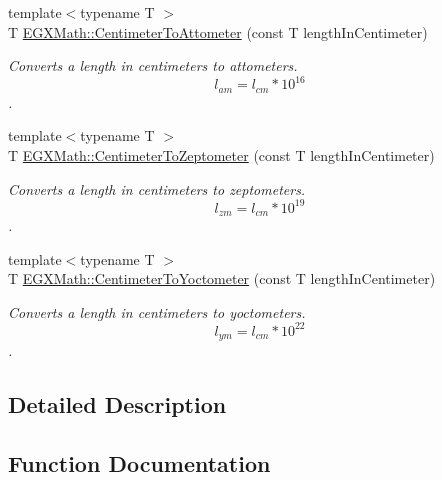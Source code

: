 \begin{DoxyCompactItemize}
{\footnotesize template$<$typename T $>$ }\\T \mbox{\hyperlink{group___e_g_x_math-_conversions-_length_conversions-_s_i-_centimeter-_s_i_ga72eb99d67c7923a3b17886b47a0fa14d}{E\+G\+X\+Math\+::\+Centimeter\+To\+Attometer}} (const T length\+In\+Centimeter)
\begin{DoxyCompactList}\small\item\em Converts a length in centimeters to attometers. \[ l_{am}=l_{cm} * 10^{16} \]. \end{DoxyCompactList}\item 
{\footnotesize template$<$typename T $>$ }\\T \mbox{\hyperlink{group___e_g_x_math-_conversions-_length_conversions-_s_i-_centimeter-_s_i_ga1f7a10f9710f514dcc9132d4ce1f0bfa}{E\+G\+X\+Math\+::\+Centimeter\+To\+Zeptometer}} (const T length\+In\+Centimeter)
\begin{DoxyCompactList}\small\item\em Converts a length in centimeters to zeptometers. \[ l_{zm}=l_{cm} * 10^{19} \]. \end{DoxyCompactList}\item 
{\footnotesize template$<$typename T $>$ }\\T \mbox{\hyperlink{group___e_g_x_math-_conversions-_length_conversions-_s_i-_centimeter-_s_i_ga251be5adc836253a22a995d9f2ce6782}{E\+G\+X\+Math\+::\+Centimeter\+To\+Yoctometer}} (const T length\+In\+Centimeter)
\begin{DoxyCompactList}\small\item\em Converts a length in centimeters to yoctometers. \[ l_{ym}=l_{cm} * 10^{22} \]. \end{DoxyCompactList}\end{DoxyCompactItemize}


\subsection{Detailed Description}


\subsection{Function Documentation}
\mbox{\label{group___e_g_x_math-_conversions-_length_conversions-_s_i-_centimeter-_s_i_ga72eb99d67c7923a3b17886b47a0fa14d}} 
